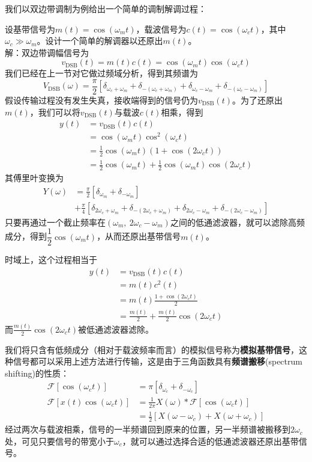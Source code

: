 我们以双边带调制为例给出一个简单的调制解调过程：
\begin{example}
设基带信号为$m(t)=\cos(\omega_m t)$，载波信号为$c(t)=\cos(\omega_c t)$，其中$\omega_c\gg \omega_m$。设计一个简单的解调器以还原出$m(t)$。\\
解：双边带调幅信号为\[v_{\text{DSB}}(t)=m(t)c(t)=\cos(\omega_m t)\cos(\omega_c t)\]
我们已经在上一节对它做过频域分析，得到其频谱为
\[V_{\text{DSB}}(\omega)=\frac{\pi}{2}\left[\delta_{\omega_c+\omega_m}+\delta_{-(\omega_c+\omega_m)}+\delta_{\omega_c-\omega_m}+\delta_{-(\omega_c-\omega_m)}\right]\]
假设传输过程没有发生失真，接收端得到的信号仍为$v_{\text{DSB}}(t)$。为了还原出$m(t)$，我们可以将$v_{\text{DSB}}(t)$与载波$c(t)$相乘，得到
\begin{align*}
    y(t)&=v_{\text{DSB}}(t)c(t)\\
    &=\cos(\omega_m t)\cos^2(\omega_c t)\\
    &=\frac{1}{2}\cos(\omega_m t)(1+\cos(2\omega_c t))\\
    &=\frac{1}{2}\cos(\omega_m t)+\frac{1}{2}\cos(\omega_m t)\cos(2\omega_c t)
\end{align*}
其傅里叶变换为
\begin{align*}
    Y(\omega)&=\frac{\pi}{2}[\delta_{\omega_m}+\delta_{-\omega_m}]\\
    &+\frac{\pi}{4}[\delta_{2\omega_c+\omega_m}+\delta_{-(2\omega_c+\omega_m)}+\delta_{2\omega_c-\omega_m}+\delta_{-(2\omega_c-\omega_m)}]
\end{align*}
只要再通过一个截止频率在$(\omega_m,\ 2\omega_c-\omega_m)$之间的低通滤波器，就可以滤除高频成分，得到$\dfrac{1}{2}\cos(\omega_m t)$，从而还原出基带信号$m(t)$。
\end{example}
时域上，这个过程相当于\begin{align*}
    y(t)&=v_{\text{DSB}}(t)c(t)\\
    &=m(t)c^2(t)\\
    &=m(t)\frac{1+\cos(2\omega_c t)}{2}\\
    &=\frac{m(t)}{2}+\frac{m(t)}{2}\cos(2\omega_c t)
\end{align*}
而$\frac{m(t)}{2}\cos(2\omega_c t)$被低通滤波器滤除。

我们将只含有低频成分（相对于载波频率而言）的模拟信号称为\textbf{模拟基带信号}，这种信号都可以采用上述方法进行传输，这是由于三角函数具有\textbf{频谱搬移}(spectrum shifting)的性质：\begin{align*}
    \mathcal{F} \left[\cos(\omega_c t)\right]&=\pi\left[\delta_{\omega_c}+\delta_{-\omega_c}\right]\\
    \mathcal{F}\left[x(t)\cos(\omega_c t)\right]&=\frac{1}{2\pi}X(\omega)*\mathcal{F}\left[\cos(\omega_c t)\right]\\
    &=\frac{1}{2}\left[X(\omega-\omega_c)+X(\omega+\omega_c)\right]
\end{align*}
经过两次与载波相乘，信号的一半频谱回到原来的位置，另一半频谱被搬移到$2\omega_c$处，可见只要信号的带宽小于$\omega_c$，就可以通过选择合适的低通滤波器还原出基带信号。

